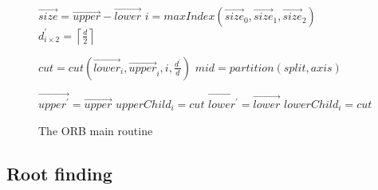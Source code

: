 \documentclass[]{article}
\begin{document}
\begin{figure}
	
	\begin{algorithm}[H]
		\caption{The ORB main routine}\label{proc:orbmain}
		\begin{algorithmic}[1]
			\State $\vec{size} = \vec{upper} - \vec{lower}$
			\State $i = maxIndex(\vec{size}_0, \vec{size}_1, \vec{size}_2)$ 
			\newline
			\State $d^\prime_{i \times 2 } = \left \lceil\frac{d}{2} \right \rceil$
			
			\State $cut = cut(\vec{lower}_{i}, \vec{upper}_{i}, i, \frac{d^\prime}{d} )$
			\State $mid = partition(split, axis)$
			\newline
			
			\State $\vec{upper^\prime} = \vec{upper}$
			\State $upperChild_{i} = cut$
			\State $\vec{lower^\prime} = \vec{lower}$
			\State $lowerChild_{i} = cut$
			\newline
			
			\State {}
			\State {}
			\EndProcedure
		\end{algorithmic}
	\end{algorithm}
\label{proc:orb}
\end{figure}

\subsection{Root finding}


\end{document}
